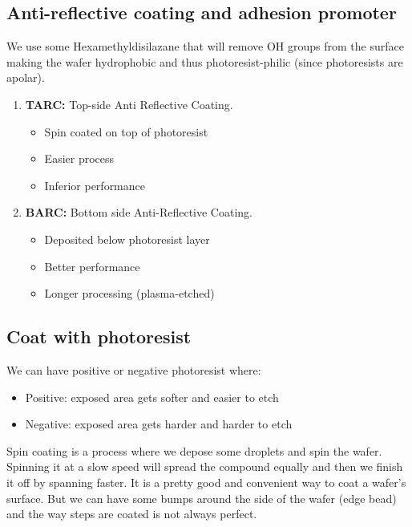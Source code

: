 \documentclass{report}
\begin{document}
\subsection{Anti-reflective coating and adhesion promoter}

We use some Hexamethyldisilazane that will remove OH groups from the surface making the wafer hydrophobic and thus photoresist-philic (since photoresists are apolar).

\begin{enumerate}
    \item \textbf{TARC:} Top-side Anti Reflective Coating.
    \begin{itemize}
        \item Spin coated on top of photoresist
        \item Easier process
        \item Inferior performance
    \end{itemize}
    \item \textbf{BARC:} Bottom side Anti-Reflective Coating.
    \begin{itemize}
        \item Deposited below photoresist layer
        \item Better performance
        \item Longer processing (plasma-etched)
    \end{itemize}
\end{enumerate}

\subsection{Coat with photoresist}

We can have positive or negative photoresist where:

\begin{itemize}
    \item Positive: exposed area gets softer and easier to etch
    \item Negative: exposed area gets harder and harder to etch
\end{itemize}

Spin coating is a process where we depose some droplets and spin the wafer. Spinning it at a slow speed will spread the compound equally and then we finish it off by spanning faster. It is a pretty good and convenient way to coat a wafer's surface. But we can have some bumps around the side of the wafer (edge bead) and the way steps are coated is not always perfect.
\end{document}
